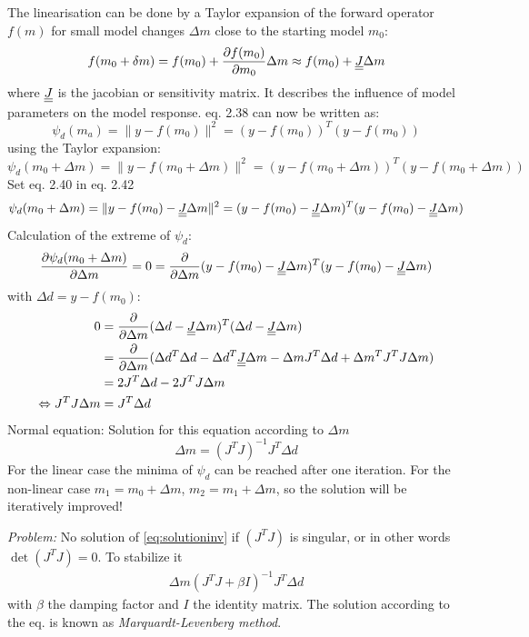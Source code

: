 The linearisation can be done by a Taylor expansion of the forward operator $f(m)$ for small model changes $\Delta m$ close to the starting model $m_0$:
\begin{align}
f(m_0+\delta m)=f(m_0)+\frac{\partial f(m_0)}{\partial m_0}\Delta m\approx f(m_0)+\underline{\underline{J}}\Delta m
\end{align}
where $\underline{\underline{J}}$ is the jacobian or sensitivity matrix. It describes the influence of model parameters on the model response. eq. 2.38 can now be written as:
\begin{equation}
\psi_d(m_a)=\|y-f(m_0)\|^2=(y-f(m_0))^T(y-f(m_0))
\end{equation}
using the Taylor expansion:
\begin{equation}
\psi_d(m_0+\Delta m)=\|y-f(m_0+\Delta m)\|^2=(y-f(m_0+\Delta m))^T(y-f(m_0+\Delta m))
\end{equation}
Set eq. 2.40 in eq. 2.42
\begin{equation}
\psi_d(m_0+\Delta m)=\|y-f(m_0)-\underline{\underline{J}}\Delta m\|^2=(y-f(m_0)-\underline{\underline{J}}\Delta m)^T(y-f(m_0)-\underline{\underline{J}}\Delta m)
\end{equation}
Calculation of the extreme of $\psi_d$:
\begin{align*}
\frac{\partial \psi_d(m_0+\Delta m)}{\partial \Delta m}=0=\frac{\partial }{\partial \Delta m}(y-f(m_0)-\underline{\underline{J}}\Delta m)^T(y-f(m_0)-\underline{\underline{J}}\Delta m)
\end{align*}
with $\Delta d=y-f(m_0)$:
\begin{align*}
0&=\frac{\partial }{\partial \Delta m}(\Delta d-\underline{\underline{J}}\Delta m)^T(\Delta d-\underline{\underline{J}}\Delta m)\\
&=\frac{\partial }{\partial \Delta m}(\Delta d^T\Delta d-\Delta d^T\underline{\underline{J}}\Delta m-\Delta m J^T\Delta d +\Delta m^TJ^TJ\Delta m)\\
&=2J^T\Delta d-2J^TJ\Delta m\\
\Leftrightarrow J^TJ\Delta m&=J^T\Delta d
\end{align*}
Normal equation: Solution for this equation according to $\Delta m$
\begin{equation}
\Delta m=(J^TJ)^{-1}J^T\Delta d\label{eq:solutioninv}
\end{equation}
For the linear case the minima of $\psi_d$ can be reached after one iteration. For the non-linear case $m_1=m_0+\Delta m$, $m_2=m_1+\Delta m$, so the solution will be iteratively improved!


\textit{Problem:} No solution of \eqref{eq:solutioninv} if $(J^T J)$ is singular, or in other words $\det(J^TJ)=0$. To stabilize it
\begin{align*}
\Delta m(J^TJ+\beta I)^{-1}J^T\Delta d
\end{align*}
with $\beta$ the damping factor and $I$ the identity matrix. The solution according to the eq. is known as \textit{Marquardt-Levenberg method}.

